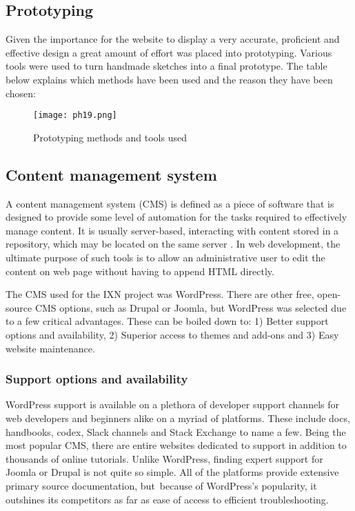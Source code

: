 \hypertarget{prototyping}{%
\subsection{Prototyping}\label{prototyping}}

Given the importance for the website to display a very accurate,
proficient and effective design a great amount of effort was placed into
prototyping. Various tools were used to turn handmade sketches into a
final prototype. The table below explains which methods have been used
and the reason they have been chosen:

\begin{figure}[H]
      \centering
      \texttt{[image: ph19.png]}
      \caption{Prototyping methods and tools used}
 \end{figure}

\hypertarget{content-management-system}{%
\subsection{Content management system}\label{content-management-system}}

A content management system (CMS) is defined as a piece of software that
is designed to provide some level of automation for the tasks required
to effectively manage content. It is usually server-based, interacting
with content stored in a repository, which may be located on the same
server \cite{p1} . In web development, the ultimate purpose of such
tools is to allow an administrative user to edit the content on web page
without having to append HTML directly.

The CMS used for the IXN project was WordPress. There are other free,
open-source CMS options, such as Drupal or Joomla, but WordPress was
selected due to a few critical advantages. These can be boiled down to:
1) Better support options and availability, 2) Superior access to themes
and add-ons and 3) Easy website maintenance.~

\hypertarget{support-options-and-availability}{%
\subsubsection{Support options and
availability~}\label{support-options-and-availability}}

WordPress support is available on a plethora of developer support
channels for web developers and beginners alike on a myriad of
platforms. These include docs, handbooks, codex, Slack channels and
Stack Exchange to name a few. Being the most popular CMS, there are
entire websites dedicated to support in addition to thousands of online
tutorials. Unlike WordPress, finding expert support for Joomla or Drupal
is not quite so simple. All of the platforms provide extensive primary
source documentation, but~because of WordPress's popularity, it
outshines its competitors as far as ease of access to efficient
troubleshooting.~

